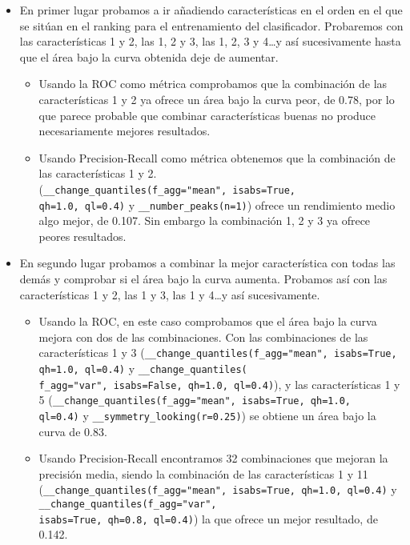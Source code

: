 \documentclass[a4paper,12pt,twoside,oldfontcommands]{memoir}
\begin{document}
	\begin{itemize}
		\item En primer lugar probamos a ir añadiendo características en el orden en el que se sitúan en el ranking para el entrenamiento del clasificador. Probaremos con las características 1 y 2, las 1, 2 y 3, las 1, 2, 3 y 4\dots y así sucesivamente hasta que el área bajo la curva obtenida deje de aumentar. 
		\begin{itemize}
			\item Usando la ROC como métrica comprobamos que la combinación de las características 1 y 2 ya ofrece un área bajo la curva peor, de 0.78, por lo que parece probable que combinar características buenas no produce necesariamente mejores resultados.
			\item Usando Precision-Recall como métrica obtenemos que la combinación de las características 1 y 2.
			\\(\texttt{\_\_change\_quantiles(f\_agg="mean", isabs=True,\\ qh=1.0, ql=0.4)} y \texttt{\_\_number\_peaks(n=1)}) ofrece un rendimiento medio algo mejor, de 0.107. Sin embargo la combinación 1, 2 y 3 ya ofrece peores resultados.
		\end{itemize} 
		\item En segundo lugar probamos a combinar la mejor característica con todas las demás y comprobar si el área bajo la curva aumenta. Probamos así con las características 1 y 2, las 1 y 3, las 1 y 4\dots y así sucesivamente. 
		\begin{itemize}
			\item Usando la ROC, en este caso comprobamos que el área bajo la curva mejora con dos de las combinaciones. Con las combinaciones de las características 1 y 3 (\texttt{\_\_change\_quantiles(f\_agg="mean", isabs=True, qh=1.0, ql=0.4)} y \texttt{\_\_change\_quantiles(\\f\_agg="var", isabs=False, qh=1.0, ql=0.4)}), y las características 1 y 5 (\texttt{\_\_change\_quantiles(f\_agg="mean", isabs=True, qh=1.0,\\ ql=0.4)} y \texttt{\_\_symmetry\_looking(r=0.25)}) se obtiene un área bajo la curva de 0.83. 
			\item Usando Precision-Recall encontramos 32 combinaciones que mejoran la precisión media, siendo la combinación de las características 1 y 11 (\texttt{\_\_change\_quantiles(f\_agg="mean", isabs=True, qh=1.0, ql=0.4)} y \texttt{\_\_change\_quantiles(f\_agg="var",\\ isabs=True, qh=0.8, ql=0.4)}) la que ofrece un mejor resultado, de 0.142. 
		\end{itemize}
	\end{itemize}
	
\end{document}
